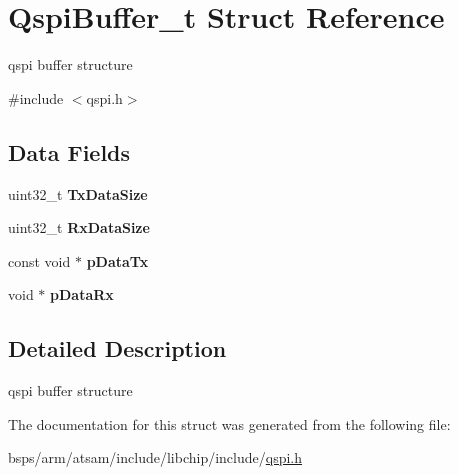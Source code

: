 \hypertarget{structQspiBuffer__t}{}\section{Qspi\+Buffer\+\_\+t Struct Reference}
\label{structQspiBuffer__t}


qspi buffer structure  




{\ttfamily \#include $<$qspi.\+h$>$}

\subsection*{Data Fields}
\begin{DoxyCompactItemize}
\item 
\mbox{\label{structQspiBuffer__t_afcab50cb235e2983640ab510f8a53709}} 
uint32\+\_\+t {\bfseries Tx\+Data\+Size}
\item 
\mbox{\label{structQspiBuffer__t_a4e79683268fb2a3316739e9139d2e501}} 
uint32\+\_\+t {\bfseries Rx\+Data\+Size}
\item 
\mbox{\label{structQspiBuffer__t_a594d4fd66c1ffa7de00badc6931d90ef}} 
const void $\ast$ {\bfseries p\+Data\+Tx}
\item 
\mbox{\label{structQspiBuffer__t_aca830338c479f3a9e25df0cddae358e0}} 
void $\ast$ {\bfseries p\+Data\+Rx}
\end{DoxyCompactItemize}


\subsection{Detailed Description}
qspi buffer structure 

The documentation for this struct was generated from the following file\+:\begin{DoxyCompactItemize}
\item 
bsps/arm/atsam/include/libchip/include/\mbox{\hyperlink{qspi_8h}{qspi.\+h}}\end{DoxyCompactItemize}
